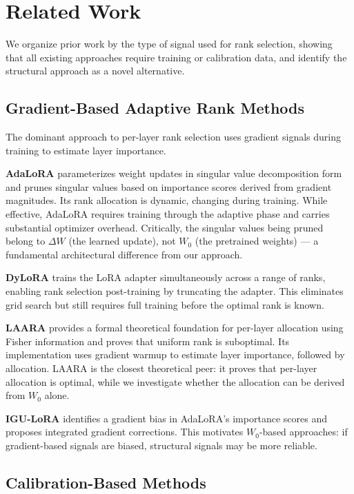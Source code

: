 \section{Related Work}
\label{sec:related}

We organize prior work by the type of signal used for rank selection, showing that all existing approaches require training or calibration data, and identify the structural approach as a novel alternative.

\subsection{Gradient-Based Adaptive Rank Methods}

The dominant approach to per-layer rank selection uses gradient signals during training to estimate layer importance.

\textbf{AdaLoRA} \cite{Zhang2023AdaLoRA} parameterizes weight updates in singular value decomposition form and prunes singular values based on importance scores derived from gradient magnitudes. Its rank allocation is dynamic, changing during training. While effective, AdaLoRA requires training through the adaptive phase and carries substantial optimizer overhead. Critically, the singular values being pruned belong to $\Delta W$ (the learned update), not $W_0$ (the pretrained weights) --- a fundamental architectural difference from our approach.

\textbf{DyLoRA} \cite{Valipour2022DyLoRA} trains the LoRA adapter simultaneously across a range of ranks, enabling rank selection post-training by truncating the adapter. This eliminates grid search but still requires full training before the optimal rank is known.

\textbf{LAARA} \cite{Tripathi2026LAARA} provides a formal theoretical foundation for per-layer allocation using Fisher information and proves that uniform rank is suboptimal. Its implementation uses gradient warmup to estimate layer importance, followed by allocation. LAARA is the closest theoretical peer: it proves that per-layer allocation is optimal, while we investigate whether the allocation can be derived from $W_0$ alone.

\textbf{IGU-LoRA} \cite{Jiang2026IGULoRA} identifies a gradient bias in AdaLoRA's importance scores and proposes integrated gradient corrections. This motivates $W_0$-based approaches: if gradient-based signals are biased, structural signals may be more reliable.

\subsection{Calibration-Based Methods}

